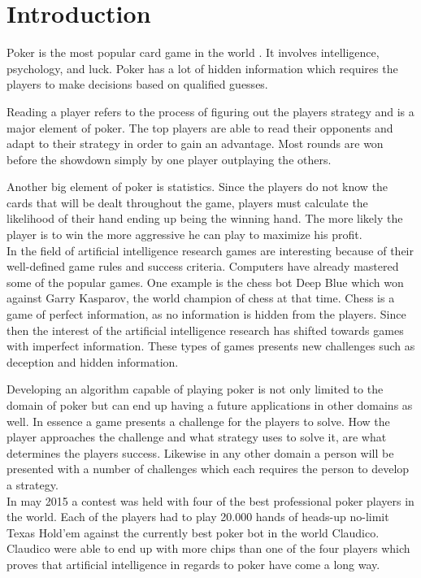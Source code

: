 \section*{Introduction}
Poker is the most popular card game in the world \cite{poker-popular}. It involves intelligence, psychology, and luck. Poker has a lot of hidden information which requires the players to make decisions based on qualified guesses.  

Reading a player refers to the process of figuring out the players strategy and is a major element of poker. The top players are able to read their opponents and adapt to their strategy in order to gain an advantage. Most rounds are won before the showdown simply by one player outplaying the others. 

Another big element of poker is statistics. Since the players do not know the cards that will be dealt throughout the game, players must calculate the likelihood of their hand ending up being the winning hand. The more likely the player is to win the more aggressive he can play to maximize his profit.\\


In the field of artificial intelligence research games are interesting because of their well-defined game rules and success criteria.
Computers have already mastered some of the popular games. One example is the chess bot Deep Blue which won against Garry Kasparov, the world champion of chess at that time.
Chess is a game of perfect information, as no information is hidden from the players.
Since then the interest of the artificial intelligence research has shifted towards games with imperfect information. These types of games presents new challenges such as deception and hidden information. 

Developing an algorithm capable of playing poker is not only limited to the domain of poker but can end up having a future applications in other domains as well. In essence a game presents a challenge for the players to solve. How the player approaches the challenge and what strategy uses to solve it, are what determines the players success. Likewise in any other domain a person will be presented with a number of challenges which each requires the person to develop a strategy.\\

In may 2015 a contest was held with four of the best professional poker players in the world. Each of the players had to play 20.000 hands of heads-up no-limit Texas Hold'em against the currently best poker bot in the world Claudico. Claudico were able to end up with more chips than one of the four players which proves that artificial intelligence in regards to poker have come a long way.


